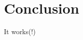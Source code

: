 \documentclass[../main/report.tex]{subfiles}
\begin{document}
\chapter{Conclusion}

It works(!)
\end{document}
